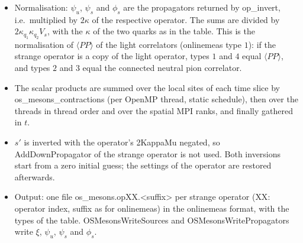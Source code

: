\begin{itemize}
  \item Normalisation: $\psi_u$, $\psi_s$ and $\phi_s$ are the propagators returned by {\ttfamily op\_invert},
        i.e.\ multiplied by $2\kappa$ of the respective operator. The sums are divided by
        $2\kappa_{q_1}\kappa_{q_2}V_s$, with the $\kappa$ of the two quarks as in the table.
        This is the normalisation of $\langle PP\rangle$ of the light correlators ({\ttfamily onlinemeas} type $1$):
        if the strange operator is a copy of the light operator, types $1$ and $4$ equal $\langle PP\rangle$,
        and types $2$ and $3$ equal the connected neutral pion correlator.
  \item The scalar products are summed over the local sites of each time slice by
        {\ttfamily os\_mesons\_contractions} (per OpenMP thread, static schedule), then over the threads
        in thread order and over the spatial MPI ranks, and finally gathered in $t$.
  \item $s'$ is inverted with the operator's {\ttfamily 2KappaMu} negated, so {\ttfamily AddDownPropagator}
        of the strange operator is not used. Both inversions start from a zero initial guess;
        the settings of the operator are restored afterwards.
  \item Output: one file {\ttfamily os\_mesons.opXX.<suffix>} per strange operator ({\ttfamily XX}: operator index,
        suffix as for {\ttfamily onlinemeas}) in the {\ttfamily onlinemeas} format, with the types of the table.
        {\ttfamily OSMesonsWriteSources} and {\ttfamily OSMesonsWritePropagators} write $\xi$, $\psi_u$,
        $\psi_s$ and $\phi_s$.
\end{itemize}
\endgroup

